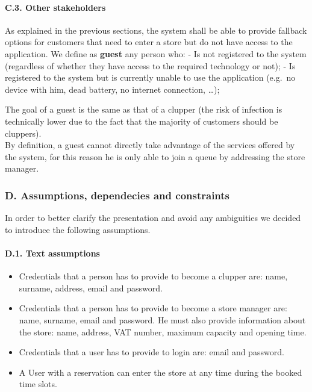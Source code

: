 \hypertarget{c.3.-other-stakeholders}{%
\paragraph{C.3. Other stakeholders}\label{c.3.-other-stakeholders}}

As explained in the previous sections, the system shall be able to
provide fallback options for customers that need to enter a store but do
not have access to the application. We define as \textbf{guest} any
person who: - Is not registered to the system (regardless of whether
they have access to the required technology or not); - Is registered to
the system but is currently unable to use the application (e.g.~no
device with him, dead battery, no internet connection, \ldots);

The goal of a guest is the same as that of a clupper (the risk of
infection is technically lower due to the fact that the majority of
customers should be cluppers).\\
By definition, a guest cannot directly take advantage of the services
offered by the system, for this reason he is only able to join a queue
by addressing the store manager.

\hypertarget{d.-assumptions-dependecies-and-constraints}{%
\subsubsection{D. Assumptions, dependecies and
constraints}\label{d.-assumptions-dependecies-and-constraints}}

In order to better clarify the presentation and avoid any ambiguities we
decided to introduce the following assumptions.

\hypertarget{d.1.-text-assumptions}{%
\paragraph{D.1. Text assumptions}\label{d.1.-text-assumptions}}

\begin{itemize}
\tightlist
\item
  Credentials that a person has to provide to become a clupper are:
  name, surname, address, email and password.
\item
  Credentials that a person has to provide to become a store manager
  are: name, surname, email and password. He must also provide
  information about the store: name, address, VAT number, maximum
  capacity and opening time.
\item
  Credentials that a user has to provide to login are: email and
  password.
\item
  A User with a reservation can enter the store at any time during the
  booked time slots.
\end{itemize}


